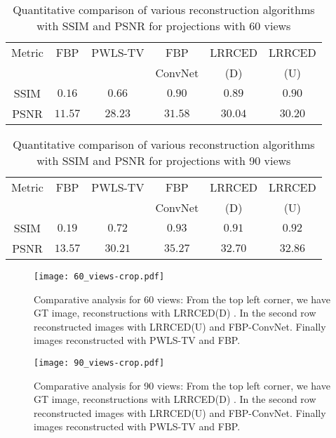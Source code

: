 \begin{table}[ht!]
	\centering
	\caption{Quantitative comparison of various reconstruction algorithms with \ac{SSIM} and \ac{PSNR} for projections with 60 views}
	\label{table:2}
	\begin{tabular}{||c|c|c|c|c|c||} 
		\hline
		Metric & FBP & PWLS-TV & FBP & \ac{LRRCED} & \ac{LRRCED}  \\ %
		&     &         & ConvNet & (D) & (U) \\
		\hline\hline
		SSIM & $0.16$ & $0.66$ & $0.90$ & $0.89$ & $0.90$ \\ 
		PSNR & $11.57$ & $28.23$ & $31.58$ & $30.04$ & $30.20$ \\   
		\hline  
		
		\hline  
	\end{tabular}
	
\end{table}

\begin{table}[ht!]
	\centering
	\caption{Quantitative comparison of various reconstruction algorithms with \ac{SSIM} and \ac{PSNR} for projections with 90 views}
	\label{table:3}
	\begin{tabular}{||c|c|c|c|c|c||} 
		\hline
		Metric & FBP & PWLS-TV & FBP & \ac{LRRCED} & \ac{LRRCED}  \\ %
		&     &         & ConvNet & (D) & (U) \\
		\hline\hline
		SSIM & $0.19$ & $0.72$ & $0.93$ & $0.91$ & $0.92$ \\ 
		PSNR & $13.57$ & $30.21$ & $35.27$ & $32.70$ & $32.86$ \\   
		\hline  
		
		\hline  
	\end{tabular}
	
\end{table}

\begin{figure}[!t]
	\centering
	\texttt{[image: 60\_views-crop.pdf]}
	\caption{Comparative analysis for 60 views: From the top left corner, we have \ac{GT} image, reconstructions with \ac{LRRCED}(D) . In the second row reconstructed images with \ac{LRRCED}(U) and FBP-ConvNet. Finally images reconstructed with PWLS-TV and \ac{FBP}.}
	\label{fig:res_60}
\end{figure}




\begin{figure}[!t]
	\centering
	\texttt{[image: 90\_views-crop.pdf]}
	\caption{Comparative analysis for 90 views: From the top left corner, we have \ac{GT} image, reconstructions with \ac{LRRCED}(D) . In the second row reconstructed images with \ac{LRRCED}(U) and FBP-ConvNet. Finally images reconstructed with PWLS-TV and \ac{FBP}.}
	\label{fig:res_90}
\end{figure}


